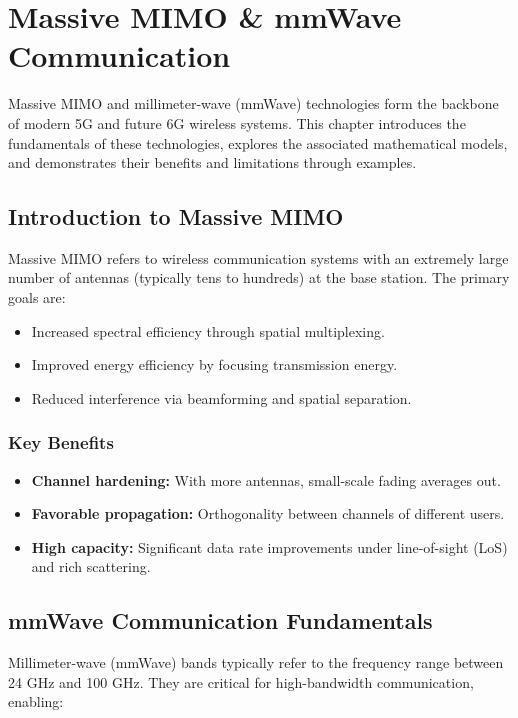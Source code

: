 
\chapter{Massive MIMO \& mmWave Communication}

Massive MIMO and millimeter-wave (mmWave) technologies form the backbone of modern 5G and future 6G wireless systems. This chapter introduces the fundamentals of these technologies, explores the associated mathematical models, and demonstrates their benefits and limitations through examples.

\section{Introduction to Massive MIMO}

Massive MIMO refers to wireless communication systems with an extremely large number of antennas (typically tens to hundreds) at the base station. The primary goals are:

\begin{itemize}
  \item Increased spectral efficiency through spatial multiplexing.
  \item Improved energy efficiency by focusing transmission energy.
  \item Reduced interference via beamforming and spatial separation.
\end{itemize}

\subsection{Key Benefits}
\begin{itemize}
  \item \textbf{Channel hardening:} With more antennas, small-scale fading averages out.
  \item \textbf{Favorable propagation:} Orthogonality between channels of different users.
  \item \textbf{High capacity:} Significant data rate improvements under line-of-sight (LoS) and rich scattering.
\end{itemize}

\section{mmWave Communication Fundamentals}

Millimeter-wave (mmWave) bands typically refer to the frequency range between 24 GHz and 100 GHz. They are critical for high-bandwidth communication, enabling:

